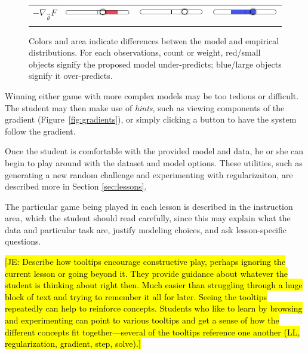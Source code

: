 \documentclass[11pt,letterpaper]{article}
\newcommand{\Note}[1]{}
\renewcommand{\Note}[1]{\hl{[#1]}}  %
\newcommand{\NoteSigned}[3]{{\sethlcolor{#2}\Note{#1: #3}}}
\newcommand{\NoteJE}[1]{\NoteSigned{JE}{LightGreen}{#1}}
\begin{document}
\begin{figure}[t]
\begin{tabular}{
>{\centering\arraybackslash}m{} 
>{\centering\arraybackslash}m{}
>{\centering\arraybackslash}m{}
>{\centering\arraybackslash}m{}}
$-\nabla_{\vec{\theta}} F$ 
& \includegraphics[scale=.25]{images/goldilocks-gradient-small.PNG}
& \includegraphics[scale=.25]{images/goldilocks-gradient-justright.PNG}
& \includegraphics[scale=.25]{images/goldilocks-gradient-large.PNG}\\ \\ 

\end{tabular}

\caption{Colors and area indicate differences betwen the model and empirical distributions. For each 
observations, count or weight, red/small objects signify the proposed model under-predicts;  
blue/large objects signify it over-predicts.}
\label{fig:colorsize_inventory}
\end{figure}

Winning either game with more complex models may be too tedious or difficult. 
The student may then make use of \textit{hints}, such as
viewing components of the gradient (Figure~\ref{fig:gradients}), or simply clicking a button to have
the system follow the gradient.  

Once the student is comfortable with the provided model and data, he
or she can begin to play around with the dataset and model options. These utilities, such as
generating a new random challenge and experimenting with regularizaiton, 
are described more in Section \ref{sec:lessons}.

The particular game being played in each lesson is described in the
instruction area, which the student should read carefully, since this
may explain what the data and particular task are, justify modeling
choices, and ask lesson-specific questions.

\NoteJE{Describe how tooltips encourage constructive play, perhaps
  ignoring the current lesson or going beyond it.  They provide
  guidance about whatever the student is thinking about right
  then. Much easier than struggling through a huge block of text and
  trying to remember it all for later. Seeing the tooltips repeatedly
  can help to reinforce concepts. Students who like to learn by
  browsing and experimenting can point to various tooltips and get a
  sense of how the different concepts fit together---several of the
  tooltips reference one another (LL, regularization, gradient, step,
  solve).}
\end{document}
